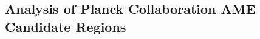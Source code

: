 \documentclass[preprint2,longabstract]{aastex}
\begin{document}

\subsection{Analysis of Planck Collaboration AME Candidate Regions}
\end{document}
